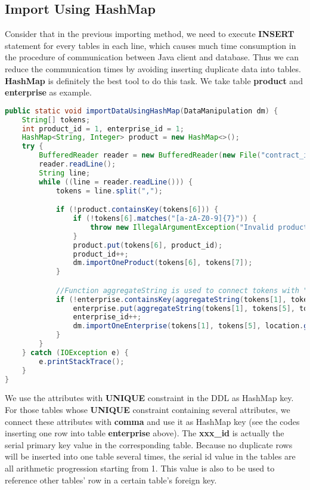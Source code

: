 \documentclass[onecolumn, oneside, ctexart, UTF8, b4paper]{SUSTechHomework}
\begin{document}
\subsection{\textbf{Import Using HashMap}}
Consider that in the previous importing method, we need to execute \textbf{INSERT} statement for every tables in each line, which causes much time consumption in the procedure of communication between Java client and database. Thus we can reduce the communication times by avoiding inserting duplicate data into tables. \textbf{HashMap} is definitely the best tool to do this task. We take table \textbf{product} and \textbf{enterprise} as example.
\begin{lstlisting}[language=Java]
public static void importDataUsingHashMap(DataManipulation dm) {
    String[] tokens;
    int product_id = 1, enterprise_id = 1;
    HashMap<String, Integer> product = new HashMap<>();
    try {
        BufferedReader reader = new BufferedReader(new File("contract_info.csv"));
        reader.readLine();
        String line;
        while ((line = reader.readLine())) {
            tokens = line.split(",");

            if (!product.containsKey(tokens[6])) {
                if (!tokens[6].matches("[a-zA-Z0-9]{7}")) {
                    throw new IllegalArgumentException("Invalid product code");
                }
                product.put(tokens[6], product_id);
                product_id++;
                dm.importOneProduct(tokens[6], tokens[7]);
            }

            //Function aggregateString is used to connect tokens with ","
            if (!enterprise.containsKey(aggregateString(tokens[1], tokens[5], tokens[3], tokens[4], tokens[2]))) {
                enterprise.put(aggregateString(tokens[1], tokens[5], tokens[3], tokens[4], tokens[2]), enterprise_id);
                enterprise_id++;
                dm.importOneEnterprise(tokens[1], tokens[5], location.get(aggregateString(tokens[3], tokens[4])), supply_center.get(tokens[2]));
            }
        }
    } catch (IOException e) {
        e.printStackTrace();
    }
}
\end{lstlisting}
We use the attributes with \textbf{UNIQUE} constraint in the DDL as HashMap key. For those tables whose \textbf{UNIQUE} constraint containing several attributes, we connect these attributes with \textbf{comma} and use it as HashMap key (see the codes inserting one row into table \textbf{enterprise} above). The \textbf{xxx\_id} is actually the serial primary key value in the corresponding table. Because no duplicate rows will be inserted into one table several times, the serial id value in the tables are all arithmetic progression starting from 1. This value is also to be used to reference other tables' row in a certain table's foreign key.
\end{document}
